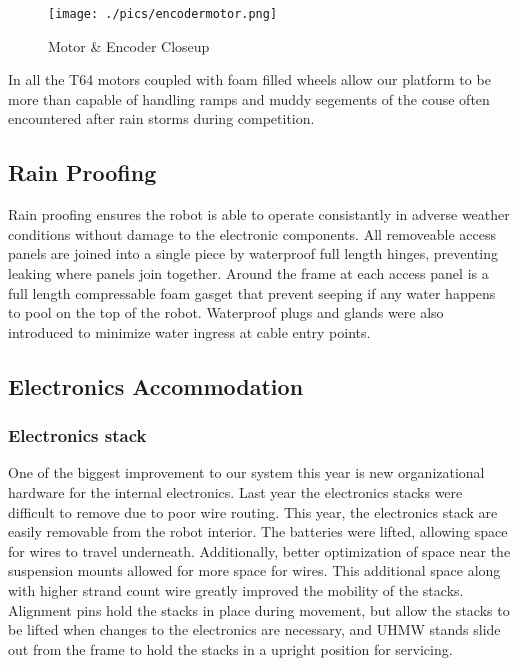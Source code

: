 \begin{figure}[H]
\begin{center}
\texttt{[image: ./pics/encodermotor.png]}
\caption{Motor \& Encoder Closeup}
\label{FIG:motorencoder}
\end{center}
\end{figure}

In all the T64 motors coupled with foam filled wheels allow our platform to be more than capable of handling ramps and muddy segements of the couse often encountered after rain storms during competition. 

\subsection{Rain Proofing}
Rain proofing ensures the robot is able to operate consistantly in adverse weather conditions without damage to the electronic components. All removeable access panels are joined into a single piece by waterproof full length hinges, preventing leaking where panels join together. Around the frame at each access panel is a full length compressable foam gasget that prevent seeping if any water happens to pool on the top of the robot. Waterproof plugs and glands were also introduced to minimize water ingress at cable entry points.

\subsection{Electronics Accommodation}
\subsubsection{Electronics stack}
One of the biggest improvement to our system this year is new organizational hardware for the internal electronics. Last year the electronics stacks were difficult to remove due to poor wire routing. This year, the electronics stack are easily removable from the robot interior. The batteries were lifted, allowing space for wires to travel underneath. Additionally, better optimization of space near the suspension mounts allowed for more space for wires. This additional space along with higher strand count wire greatly improved the mobility of the stacks. Alignment pins hold the stacks in place during movement, but allow the stacks to be lifted when changes to the electronics are necessary, and UHMW stands slide out from the frame to hold the stacks in a upright position for servicing.

